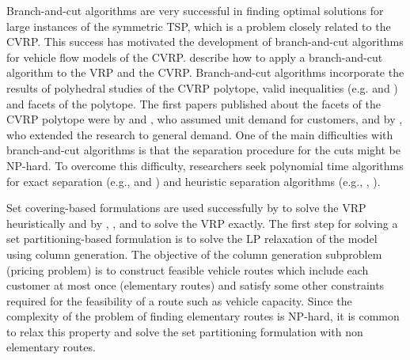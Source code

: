 Branch-and-cut algorithms are very successful in finding optimal solutions for large 
instances of the symmetric TSP, which is a problem closely related to the CVRP. This 
success has motivated the development of branch-and-cut algorithms for vehicle flow 
models of the CVRP. \cite{Toth} describe how to apply a branch-and-cut algorithm to the 
VRP and the CVRP. Branch-and-cut algorithms incorporate the results of polyhedral studies 
of the CVRP polytope, valid inequalities (e.g. \citet{Laporte4} and \citet{Laporte5}) and 
facets of the polytope. The first papers published about the facets of the CVRP polytope 
were by \citet*{Araque1} and \citet{Araque2}, who  assumed unit demand for customers, and 
by \citet{Cornuejols93}, who extended the research to general demand. One of the main 
difficulties with branch-and-cut algorithms is that the separation procedure for the cuts 
might be NP-hard. To overcome this difficulty, researchers seek polynomial time
algorithms for exact separation (e.g., \citet{McCormick} and \citet{Blasum}) and
heuristic separation algorithms (e.g., \citet{Augerat2}, \citet{Ralphs}). 
 
Set covering-based formulations are used successfully by \citet{Cullen} 
to solve the VRP heuristically and by \citet{Agarwal}, \citet{Bixby}, \citet{Hadjiconstantinou} 
and \citet{Desrochers2} to solve the VRP exactly. The first step for solving a set 
partitioning-based formulation is to solve the LP relaxation of the model using column 
generation. The objective of the column generation subproblem (pricing problem) is 
to construct feasible vehicle routes which include each customer at most once 
(elementary routes) and satisfy some other constraints required for the feasibility 
of a route such as vehicle capacity. Since the complexity of the problem of finding 
elementary routes is NP-hard, it is common to relax this property and solve the set
partitioning formulation with non elementary routes.


